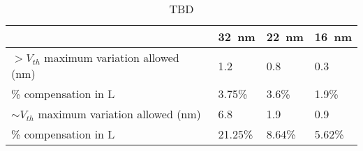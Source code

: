 \begin{table}
  \caption {TBD}  
  \centering
  \label {tbl:compensation}
  \begin{tabular}{ | l | l | l | l | }
    \hline
    & \SI{32}{\nano\meter} & \SI{22}{\nano\meter} & \SI{16}{\nano\meter} \\ \hline
    $>V_{th}$ maximum variation allowed (nm) & 1.2 & 0.8 & 0.3 \\ \hline
    \% compensation in L  & 3.75\% & 3.6\% & 1.9\% \\ \hline
    $\sim V_{th}$ maximum variation allowed (nm)  & 6.8 & 1.9 & 0.9\\  \hline
    \% compensation in L & 21.25\% & 8.64\% & 5.62\% \\ 
    \hline
  \end{tabular}
\end{table}
